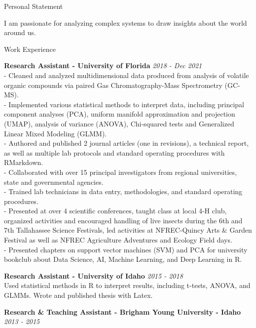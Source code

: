 \documentclass{resume} %
\begin{document}
\begin{rSection}{Personal Statement}
	
	I am passionate for analyzing complex systems to draw insights about the world around us.
	
\end{rSection}

\begin{rSection}{Work Experience}
	
	\textbf{Research Assistant - University of Florida} \hfill {\em \textit{2018 - Dec 2021}}\\
 - Cleaned and analyzed multidimensional data produced from analysis of volatile organic compounds via paired Gas Chromatography-Mass Spectrometry (GC-MS).\\
 -  Implemented various statistical methods to interpret data, including principal component analyses (PCA), uniform manifold approximation and projection (UMAP), analysis of variance (ANOVA), Chi-squared tests and Generalized Linear Mixed Modeling (GLMM). \\
 - Authored and published 2 journal articles (one in revisions), a technical report, as well as multiple lab protocols and standard operating procedures with RMarkdown.\\
 - Collaborated with over 15 principal investigators from regional universities, state and governmental agencies. \\
 - Trained lab technicians in data entry, methodologies, and standard operating procedures.\\
 - Presented at over 4 scientific conferences, taught class at local 4-H club, organized activities and encouraged handling of live insects during the 6th and 7th Tallahassee Science Festivals, led activities at NFREC-Quincy Arts \& Garden Festival as well as NFREC Agriculture Adventures and Ecology Field days.\\
 - Presented chapters on support vector machines (SVM) and PCA for university bookclub about Data Science, AI, Machine Learning, and Deep Learning in R.

\textbf{Research Assistant - University of Idaho} \hfill {\em \textit{2015 - 2018}}\\
Used statistical methods in R to interpret results, including t-tests, ANOVA, and GLMMs. Wrote and published thesis with Latex.
		
\textbf{Research \& Teaching Assistant - Brigham Young University - Idaho} \hfill {\em \textit{2013 - 2015}}\\
	\hfill
\end{rSection}
\end{document}
